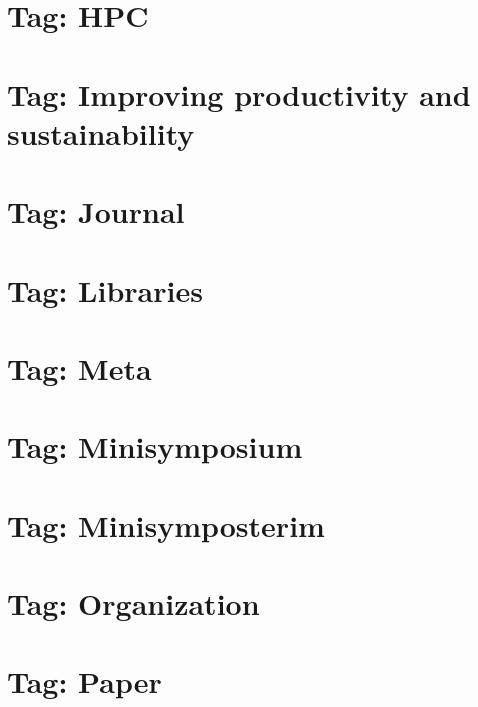 \documentclass[twoside]{book}
\newcommand{\+}{\discretionary{\mbox{\scriptsize$\hookleftarrow$}}{}{}}
\begin{document}
\chapter{Tag\+: H\+PC}
\label{md_markdown_tag_hpc}

\chapter{Tag\+: Improving productivity and sustainability}
\label{md_markdown_tag_improving_productivity_and_sustainability}

\chapter{Tag\+: Journal}
\label{md_markdown_tag_journal}

\chapter{Tag\+: Libraries}
\label{md_markdown_tag_libraries}

\chapter{Tag\+: Meta}
\label{md_markdown_tag_meta}

\chapter{Tag\+: Minisymposium}
\label{md_markdown_tag_minisymposium}

\chapter{Tag\+: Minisymposterim}
\label{md_markdown_tag_minisymposterim}

\chapter{Tag\+: Organization}
\label{md_markdown_tag_organization}

\chapter{Tag\+: Paper}
\label{md_markdown_tag_paper}

\end{document}
